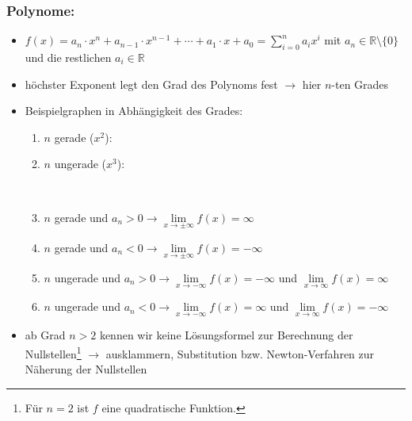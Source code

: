 \subsubsection{Polynome:}
\begin{itemize}
\item $f(x)= a_n\cdot x^n + a_{n-1} \cdot x^{n-1} + \cdots + a_1 \cdot x + a_0 =\sum\limits_{i=0}^{n} a_i x^i$ mit $a_n\in \mathds{R}\setminus \{0\}$ und die restlichen $a_{i} \in \mathds{R}$
\item höchster Exponent legt den Grad des Polynoms fest $\longrightarrow$ hier $n$-ten Grades
\item Beispielgraphen in Abhängigkeit des Grades:\\
\begin{enumerate}\item $n$ gerade ($x^2$): 
\item $n$ ungerade ($x^3$): \\
\item $n$ gerade und $a_n > 0 \longrightarrow \lim\limits_{x \to \pm\infty} f(x) = \infty$\\
\item $n$ gerade und $a_n <0 \longrightarrow \lim\limits_{x \to \pm\infty} f(x) =- \infty$\\
\item $n$ ungerade und $a_n > 0 \longrightarrow \lim\limits_{x \to -\infty} f(x) = -\infty$ und $ \lim\limits_{x \to \infty} f(x) = \infty$\\
\item $n$ ungerade und $a_n < 0 \longrightarrow \lim\limits_{x \to -\infty} f(x) = \infty$ und $ \lim\limits_{x \to \infty} f(x) = -\infty$
\end{enumerate}
\item ab Grad $n>2$ kennen wir keine Lösungsformel zur Berechnung der Nullstellen\footnote{Für $n=2$ ist $f$ eine quadratische Funktion.} $\longrightarrow$ ausklammern, Substitution bzw. Newton-Verfahren zur Näherung der Nullstellen
\end{itemize}
